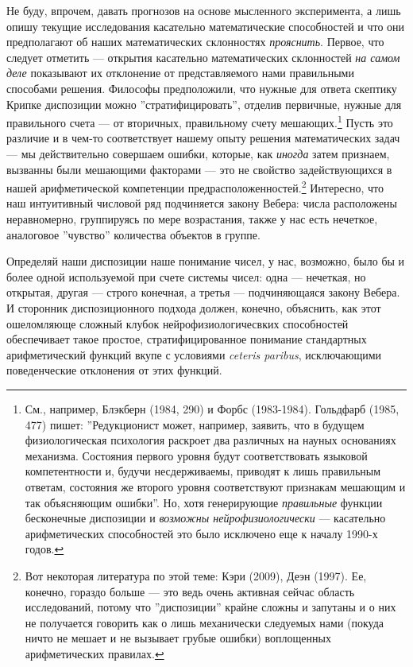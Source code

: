 \documentclass[11pt]{book}
\begin{document}
Не буду, впрочем, давать прогнозов на основе мысленного эксперимента, а лишь опишу текущие исследования касательно математические способностей и что они предполагают об наших математических склонностях \textit{прояснить}. Первое, что следует отметить --- открытия касательно математических склонностей \textit{на самом деле} показывают их отклонение от представляемого нами правильными способами решения. Философы предположили, что нужные для ответа скептику Крипке диспозиции можно ''стратифицировать'', отделив первичные, нужные для правильного счета --- от вторичных, правильному счету мешающих.\footnote{См., например, Блэкберн (1984, 290) и Форбс (1983-1984). Гольдфарб (1985, 477) пишет: ''Редукционист может, например, заявить, что в будущем физиологическая психология раскроет два различных на науных основаниях механизма. Состояния первого уровня будут соответствовать языковой компетентности и, будучи несдерживаемы, приводят к лишь правильным ответам, состояния же второго уровня соответствуют признакам мешающим и так объясняющим ошибки''. Но, хотя генерирующие \textit{правильные} функции бесконечные диспозиции и \textit{возможны нейрофизиологически} --- касательно арифметических способностей это было исключено еще к началу 1990-х годов.} Пусть это различие и в чем-то соответствует нашему опыту решения математических задач --- мы действительно совершаем ошибки, которые, как \textit{иногда} затем признаем, вызванны были мешающими факторами --- это не свойство задействующихся в нашей арифметической компетенции предрасположенностей.\footnote{Вот некоторая литература по этой теме: Кэри (2009), Деэн (1997). Ее, конечно, гораздо больше --- это ведь очень активная сейчас область исследований, потому что ''диспозиции'' крайне сложны и запутаны и о них не получается говорить как о лишь механически следуемых нами (покуда ничто не мешает и не вызывает грубые ошибки) воплощенных арифметических правилах.} Интересно, что наш интуитивный числовой ряд подчиняется закону Вебера: числа расположены неравномерно, группируясь по мере возрастания, также у нас есть нечеткое, аналоговое ''чувство'' количества объектов в группе.

Определяй наши диспозиции наше понимание чисел, у нас, возможно, было бы и более одной используемой при счете системы чисел: одна --- нечеткая, но открытая, другая --- строго конечная, а третья --- подчиняющаяся закону Вебера. И сторонник диспозиционного подхода должен, конечно, объяснить, как этот ошеломляюще сложный клубок нейрофизиологичесвких способностей обеспечивает такое простое, стратифицированное понимание стандартных арифметический функций вкупе с условиями \textit{ceteris paribus}, исключающими поведенческие отклонения от этих функций.
\end{document}
